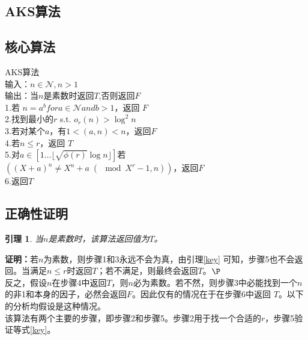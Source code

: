 \documentclass[a4paper]{article}
\newtheorem{lemma}{引理}[section]
\numberwithin{equation}{section}
\begin{document}
\begin{multicols}{2}
  \section{AKS算法}
  \subsection{核心算法}\label{sec_r1}
  \begin{boxedminipage}{\columnwidth}
    AKS算法\\
    输入：$n\in\mathcal{N},n>1$\\
    输出：当$n$是素数时返回$T$,否则返回$F$\\
    1.\quad 若 $n=a^b for a\in\mathcal{N} and b>1$，返回 $F$\\
    2.\quad 找到最小的$r$ s.t. $o_r (n)>\log^2 n$\\
    3.\quad 若对某个$a$，有$1<(a,n)<n$，返回$F$\\
    4.\quad 若$n\le r$，返回 $T$\\
    5.\quad 对$a\in\left[1\ldots\lfloor\sqrt{\phi (r)}\log n\rfloor\right]$若\\
    \indent\quad$\left((X+a)^n\ne X^n+a\;(\!\!\!\!\!\mod X^r-1,n)\right)$，返回$F$\\
    6.\quad 返回$T$
  \end{boxedminipage}
  \subsection{正确性证明}
  \begin{lemma}\label{pp}
    \upshape 当$n$是素数时，该算法返回值为$T$。
  \end{lemma}
  \textbf{证明：}若$n$为素数，则步骤1和3永远不会为真，由引理\ref{key} 可知，步骤5也不会返回。当满足$n\le
  r$时返回$T$；若不满足，则最终会返回$T$。$\P$\\[.2cm]
  反之，假设$n$在步骤4中返回$T$，则$n$必为素数。若不然，则步骤3中必能找到一个$n$的非1和本身的因子，必然会返回$F$。因此仅有的情况在于在步骤6中返回
  $T$。以下的分析均假设是这种情况。\\
  该算法有两个主要的步骤，即步骤2和步骤5。步骤2用于找一个合适的$r$，步骤5验证等式\ref{key}。


\end{multicols}
\end{document}
